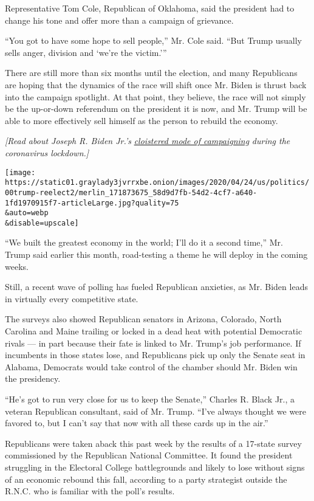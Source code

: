 Representative Tom Cole, Republican of Oklahoma, said the president had
to change his tone and offer more than a campaign of grievance.

``You got to have some hope to sell people,'' Mr. Cole said. ``But Trump
usually sells anger, division and `we're the victim.'''

There are still more than six months until the election, and many
Republicans are hoping that the dynamics of the race will shift once Mr.
Biden is thrust back into the campaign spotlight. At that point, they
believe, the race will not simply be the up-or-down referendum on the
president it is now, and Mr. Trump will be able to more effectively sell
himself as the person to rebuild the economy.

\emph{{[}Read about Joseph R. Biden Jr.'s}
\href{https://www.nytimes3xbfgragh.onion/2020/04/25/us/politics/joe-biden-coronavirus-quarantine.html}{\emph{cloistered
mode of campaigning}} \emph{during the coronavirus lockdown.{]}}

\texttt{[image: https://static01.graylady3jvrrxbe.onion/images/2020/04/24/us/politics/00trump-reelect2/merlin\_171873675\_58d9d7fb-54d2-4cf7-a640-1fd1970915f7-articleLarge.jpg?quality=75\\\&auto=webp\\\&disable=upscale]}

``We built the greatest economy in the world; I'll do it a second
time,'' Mr. Trump said earlier this month, road-testing a theme he will
deploy in the coming weeks.

Still, a recent wave of polling has fueled Republican anxieties, as Mr.
Biden leads in virtually every competitive state.

The surveys also showed Republican senators in Arizona, Colorado, North
Carolina and Maine trailing or locked in a dead heat with potential
Democratic rivals --- in part because their fate is linked to Mr.
Trump's job performance. If incumbents in those states lose, and
Republicans pick up only the Senate seat in Alabama, Democrats would
take control of the chamber should Mr. Biden win the presidency.

``He's got to run very close for us to keep the Senate,'' Charles R.
Black Jr., a veteran Republican consultant, said of Mr. Trump. ``I've
always thought we were favored to, but I can't say that now with all
these cards up in the air.''

Republicans were taken aback this past week by the results of a 17-state
survey commissioned by the Republican National Committee. It found the
president struggling in the Electoral College battlegrounds and likely
to lose without signs of an economic rebound this fall, according to a
party strategist outside the R.N.C. who is familiar with the poll's
results.


